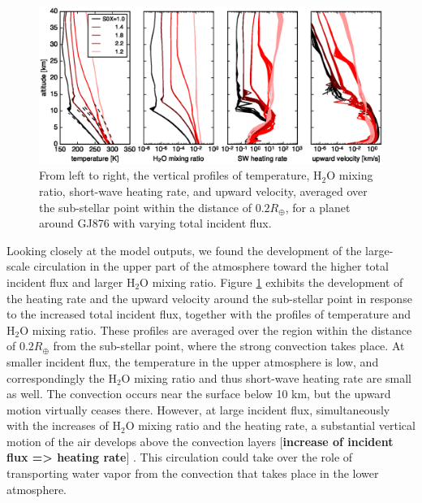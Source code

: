 \documentclass[11pt,numberedappendix,twocolappendix,]{emulateapj}
\def\water{H$_2$O }
\def\memo#1{\color{red}$[${\bf #1}$]$ \color{black}}
\begin{document}
\begin{figure}[htb]
    \begin{center}
    \includegraphics[width=0.8\hsize]{fig/AqOH0TLS_GJ876_temp_xH2O_vz_heat.eps}
    \end{center}
\caption{From left to right, the vertical profiles of temperature, \water mixing ratio, short-wave heating rate, and upward velocity, averaged over the sub-stellar point within the distance of $0.2R_{\oplus }$, for a planet around GJ876 with varying total incident flux. }                                                                                                             
\label{fig:AqOH0TLS_GJ876_temp_xH2O_vz_heat}
\end{figure}


Looking closely at the model outputs, we found the development of the large-scale circulation in the upper part of the atmosphere toward the higher total incident flux and larger \water mixing ratio. 
Figure \ref{fig:AqOH0TLS_GJ876_temp_xH2O_vz_heat} exhibits the development of the heating rate and the upward velocity around the sub-stellar point in response to the increased total incident flux, together with the profiles of temperature and \water mixing ratio. 
These profiles are averaged over the region within the distance of $0.2R_{\oplus }$ from the sub-stellar point, where the strong convection takes place. 
%
At smaller incident flux, the temperature in the upper atmosphere is low, and correspondingly the \water mixing ratio and thus short-wave heating rate are small as well. 
The convection occurs near the surface below 10 km, but the upward motion virtually ceases there. 
%
However, at large incident flux, simultaneously with the increases of \water mixing ratio and the heating rate, a substantial vertical motion of the air develops above the convection layers \memo{increase of incident flux => heating rate}. 
This circulation could take over the role of transporting water vapor from the convection that takes place in the lower atmosphere. 
\end{document}
